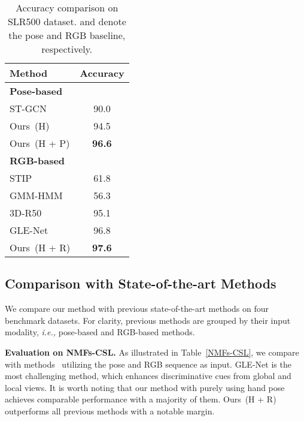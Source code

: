 \documentclass[10pt,twocolumn,letterpaper]{article}
\begin{document}
\begin{table}
\small
\begin{center}
\tabcolsep=14pt
\begin{threeparttable}
\begin{tabular}{l|c}
\hline
Method  &  Accuracy   \\  \hline \hline 
\textbf{Pose-based} \\
ST-GCN~\cite{yan2018spatial} &  90.0 \\
Ours~(H)      & 94.5     \\ 
Ours~(H + P)  & \textbf{96.6}      \\ \hline
\textbf{RGB-based}  \\
STIP~\cite{laptev2005space}   &  61.8 \\
GMM-HMM~\cite{tang2015real} &  56.3 \\
3D-R50~\cite{qiu2017learning}  &  95.1 \\
GLE-Net~\cite{hu2020global}   & 96.8      \\  \hline
Ours~(H + R)  & \textbf{97.6}      \\ \hline 
\end{tabular}
\end{threeparttable}
\end{center}
\vspace{-0.2cm}
\caption{Accuracy comparison on SLR500 dataset. \cite{yan2018spatial} and \cite{qiu2017learning} denote the pose and RGB baseline, respectively. }
\label{slr500}
\vspace{-0.3cm}
\end{table}




\subsection{Comparison with State-of-the-art Methods}
We compare our method with previous state-of-the-art methods on four benchmark datasets.
For clarity, previous methods are grouped by their input modality, \emph{i.e.,} pose-based and RGB-based methods.

\noindent \textbf{Evaluation on NMFs-CSL.}
As illustrated in Table~\ref{NMFs-CSL}, we compare with methods~\cite{yan2018spatial, qiu2017learning, cui2019deep, carreira2017quo, lin2019tsm, feichtenhofer2019slowfast, hu2020global} utilizing the pose and RGB sequence as input. 
GLE-Net \cite{hu2020global} is the most challenging method, which enhances discriminative cues from global and local views. 
It is worth noting that our method with purely using hand pose achieves comparable performance with a majority of them. 
Ours~(H + R) outperforms all previous methods with a notable margin.
\end{document}
